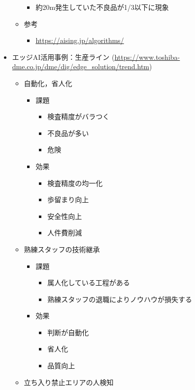 \begin{itemize}
\begin{itemize}
\begin{itemize}
			\item 約20m発生していた不良品が1/3以下に現象
		\end{itemize}
		\item 参考
		\begin{itemize}
			\item \url{https://aising.jp/algorithms/}
		\end{itemize}
	\end{itemize}
	\item エッジAI活用事例：生産ライン (\url{https://www.toshiba-dme.co.jp/dme/dig/edge_solution/trend.htm})
	\begin{itemize}
		\item 自動化，省人化
		\begin{itemize}
			\item 課題
			\begin{itemize}
				\item 検査精度がバラつく
				\item 不良品が多い
				\item 危険
			\end{itemize}
			\item 効果
			\begin{itemize}
				\item 検査精度の均一化
				\item 歩留まり向上
				\item 安全性向上
				\item 人件費削減
			\end{itemize}
		\end{itemize}
		\item 熟練スタッフの技術継承
		\begin{itemize}
			\item 課題
			\begin{itemize}
				\item 属人化している工程がある
				\item 熟練スタッフの退職によりノウハウが損失する
			\end{itemize}
			\item 効果
			\begin{itemize}
				\item 判断が自動化
				\item 省人化
				\item 品質向上
			\end{itemize}
		\end{itemize}
		\item 立ち入り禁止エリアの人検知
		\begin{itemize}

\end{itemize}
\end{itemize}
\end{itemize}

